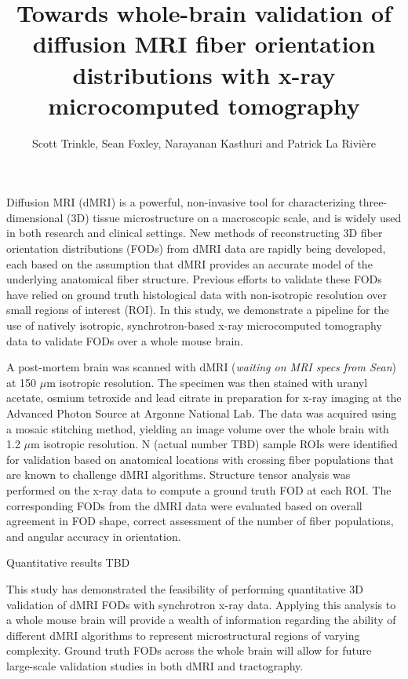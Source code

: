 \documentclass[11pt]{article}
\title{Towards whole-brain validation of diffusion MRI fiber orientation
  distributions with x-ray microcomputed tomography}
\author{Scott Trinkle, Sean
  Foxley, Narayanan Kasthuri and Patrick La Rivi\`ere}
\date{}
\begin{document}
\maketitle

Diffusion MRI (dMRI) is a powerful, non-invasive tool for characterizing
three-dimensional (3D) tissue microstructure on a macroscopic scale, and is
widely used in both research and clinical settings. New methods of
reconstructing 3D fiber orientation distributions (FODs) from dMRI data are
rapidly being developed, each based on the assumption that dMRI provides an
accurate model of the underlying anatomical fiber structure. Previous efforts to
validate these FODs have relied on ground truth histological data with
non-isotropic resolution over small regions of interest (ROI). In this study, we
demonstrate a pipeline for the use of natively isotropic, synchrotron-based x-ray
microcomputed tomography data to validate FODs over a whole mouse brain.

A post-mortem brain was scanned with dMRI (\textit{waiting on MRI specs from
  Sean}) at 150 $\mu\text{m}$ isotropic resolution. The specimen was then
stained with uranyl acetate, osmium tetroxide and lead citrate in preparation
for x-ray imaging at the Advanced Photon Source at Argonne National Lab. The
data was acquired using a mosaic stitching method, yielding an image volume over
the whole brain with 1.2 $\mu$m isotropic resolution. N (actual number TBD)
sample ROIs were identified for validation based on anatomical locations with
crossing fiber populations that are known to challenge dMRI
algorithms. Structure tensor analysis was performed on the x-ray data to compute
a ground truth FOD at each ROI. The corresponding FODs from the dMRI data were
evaluated based on overall agreement in FOD shape, correct assessment of the
number of fiber populations, and angular accuracy in orientation.

Quantitative results TBD

This study has demonstrated the feasibility of performing quantitative 3D
validation of dMRI FODs with synchrotron x-ray data. Applying this analysis to a
whole mouse brain will provide a wealth of information regarding the ability of
different dMRI algorithms to represent microstructural regions of varying
complexity. Ground truth FODs across the whole brain
will allow for future large-scale validation studies in both dMRI and
tractography.
\end{document}
